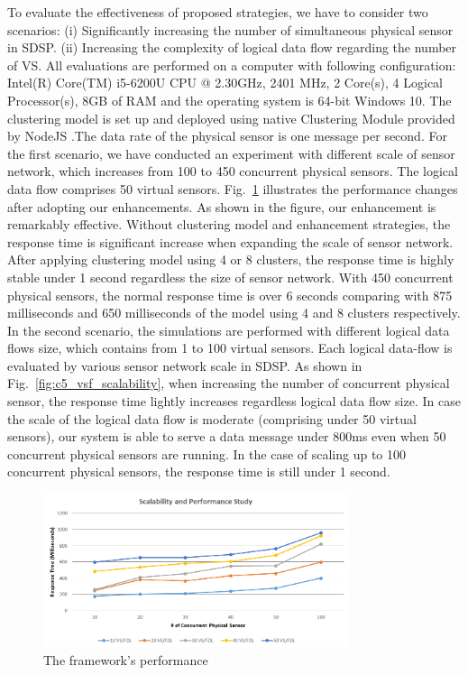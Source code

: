 To evaluate the effectiveness of proposed strategies, we have to consider two scenarios: (i) Significantly increasing the number of simultaneous physical sensor in SDSP. (ii) Increasing the complexity of logical data flow regarding the number of VS. All evaluations are performed on a computer with following configuration: Intel(R) Core(TM) i5-6200U CPU @ 2.30GHz, 2401 MHz, 2 Core(s), 4 Logical Processor(s), 8GB of RAM and the operating system is 64-bit Windows 10. The clustering model is set up and deployed using native Clustering Module  provided by NodeJS .The data rate of the physical sensor is one message per second. For the first scenario, we have conducted an experiment with different scale of sensor network, which increases from 100 to 450 concurrent physical sensors. The logical data flow comprises 50 virtual sensors. Fig.~\ref{fig:c5_vsf_performance} illustrates the performance changes after adopting our enhancements. As shown in the figure, our enhancement is remarkably effective. Without clustering model and enhancement strategies, the response time is significant increase when expanding the scale of sensor network. After applying clustering model using 4 or 8 clusters, the response time is highly stable under 1 second regardless the size of sensor network. With 450 concurrent physical sensors, the normal response time is over 6 seconds comparing with 875 milliseconds and 650 milliseconds of the model using 4 and 8 clusters respectively.\\

In the second scenario, the simulations are performed with different logical data flows size, which contains from 1 to 100 virtual sensors. Each logical data-flow is evaluated by various sensor network scale in SDSP. As shown in Fig.~\ref{fig:c5_vsf_scalability}, when increasing the number of concurrent physical sensor, the response time lightly increases regardless logical data flow size. In case the scale of the logical data flow is moderate (comprising under 50 virtual sensors), our system is able to serve a data message under 800ms even when 50 concurrent physical sensors are running. In the case of scaling up to 100 concurrent physical sensors, the response time is still under  1 second.

\begin{figure}[h!] 
 \begin{center} 
 \includegraphics[width=0.8\textwidth]{./Part2/Chapter5/figures/vsf_performance.png} 
    \caption{The framework’s performance}
     \label{fig:c5_vsf_performance}
  \end{center} 
\end{figure}

